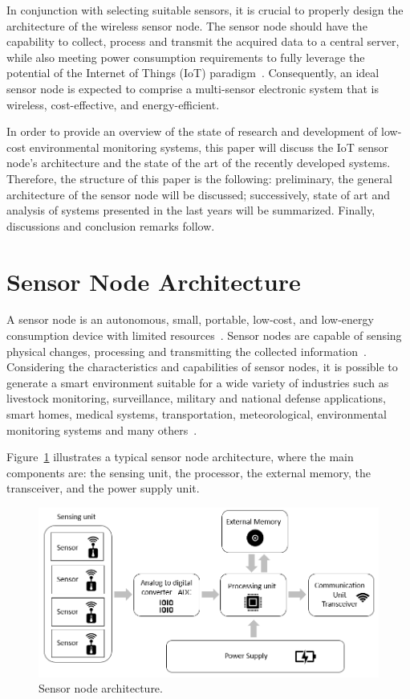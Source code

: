 \documentclass[10pt]{../style_src/imeko_acta}
\begin{document}
In conjunction with selecting suitable sensors, it is crucial to properly design the architecture of the wireless sensor node. The sensor node should have the capability to collect, process and transmit the acquired data to a central server, while also meeting power consumption requirements to fully leverage the potential of the Internet of Things (IoT) paradigm~\cite{suryavansh2021data, 5522465}. Consequently, an ideal sensor node is expected to comprise a multi-sensor electronic system that is wireless, cost-effective, and energy-efficient.

In order to provide an overview of the state of research and development of low-cost environmental monitoring systems, this paper will discuss the IoT sensor node's architecture and the state of the art of the recently developed systems. Therefore, the structure of this paper is the following: preliminary, the general architecture of the sensor node will be discussed; successively, state of art and analysis of systems presented in the last years will be summarized. Finally, discussions and conclusion remarks follow.

\section{Sensor Node Architecture}
A sensor node is an autonomous, small, portable, low-cost, and low-energy consumption device with limited resources~\cite{TENG2012251, STANKOVIC2013223}. Sensor nodes are capable of sensing physical changes, processing and transmitting the collected information~\cite{1197877, 9764728}. Considering the characteristics and capabilities of sensor nodes, it is possible to generate a smart environment suitable for a wide variety of industries such as livestock monitoring, surveillance,  military and national defense applications, smart homes, medical systems, transportation, meteorological, environmental monitoring systems and many others~\cite{1197877, 6859717, farha2010middleware, 5639549}.

Figure~\ref{sensor_node} illustrates a typical sensor node architecture, where the main components are: the sensing unit, the processor, the external memory, the transceiver, and the power supply unit. 

\begin{figure}[!tb]
	\centering
	\includegraphics[width=\linewidth]{sensor_node_architectutre.png}
	\caption{Sensor node architecture.}
	\label{sensor_node}
\end{figure}
\end{document}
